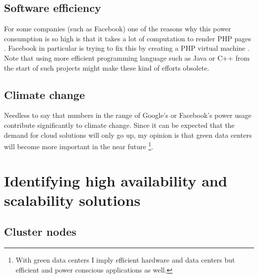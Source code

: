 \documentclass[12pt]{report}
\begin{document}
\section{Software efficiency}
For some companies (such as Facebook) one of the reasons why this
power consumption is so high is that it takes a lot of computation to
render PHP pages \cite{facebook_php}. Facebook in particular is trying
to fix this by creating a PHP virtual machine \cite{php_vm}.\\
Note that using more efficient programming language such as Java or C++ 
from the start of such projects might make these kind of efforts
obsolete.

\section{Climate change}
Needless to say that numbers in the range of Google's or Facebook's
power usage contribute significantly to climate change. Since it can
be expected that the demand for cloud solutions will only go up, my
opinion is that green data centers will become more
important in the near future \footnote{With green data centers I imply
  efficient hardware and data centers but efficient and power conscious
applications as well.}.\\

\chapter{Identifying high availability and scalability solutions}
\section{Cluster nodes}
\end{document}
